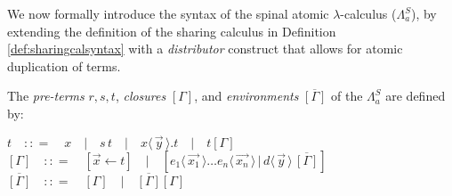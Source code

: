 \documentclass[a4paper,UKenglish,cleveref, autoref]{lipics-v2019}
\newcommand{\FALC}{\Lambda^{S}_{a}}
\newcommand{\app}[2]{#1 \, #2}
\newcommand{\fake}[3]{#1 \langle \, #2 \, \rangle . #3}
\newcommand{\dist}[5]{#1 [ #2 \, \vert \, \fakedist{#4}{#5} \, #3 ]}
\newcommand{\fakedist}[2]{#1 \langle \, #2 \, \rangle}
\newcommand{\sharerule}{\triangle}
\begin{document}
%

We now formally introduce the syntax of the spinal atomic $\lambda$-calculus ($\FALC$), by extending the definition of the sharing calculus in Definition \ref{def:sharingcalsyntax} with a \emph{distributor} construct that allows for atomic duplication of terms.

\begin{definition} The \emph{pre-terms} $r, s, t$, \emph{closures} $[\Gamma]$, and \emph{environments} $\overline{[\Gamma]}$ of the $\FALC$ are defined by:

\begin{center}
$t \quad {:}{:}{=} \quad x \quad \vert \quad \app{s}{t} \quad \vert \quad \fake{x}{\vec{y}}{t} \quad \vert \quad t[\Gamma]$
\\[0.2cm]
$[\Gamma] \quad {:}{:}{=} \quad  [\vec{x} \leftarrow t] \quad \vert \quad \dist{}{\fakedist{e_{1}}{\vec{x_{1}}} \dots \fakedist{e_{n}}{\vec{x_{n}}}}{\overline{[\Gamma]}}{d}{\vec{y}}$  \quad \quad $\overline{[\Gamma]} \quad {:}{:}{=} \quad [\Gamma] \quad \vert \quad \overline{[\Gamma]}[\Gamma]$
\end{center}

\end{definition}
\end{document}
